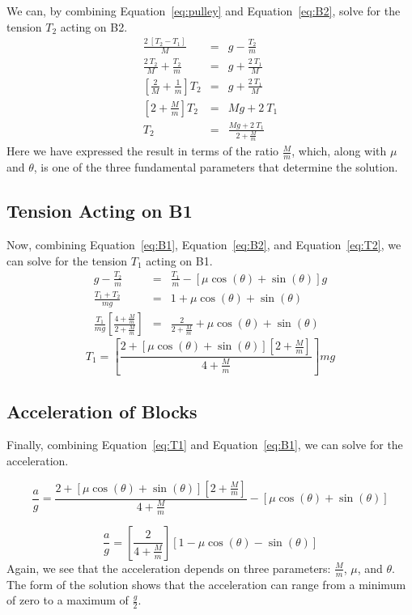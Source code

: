 \documentclass[twocolumn]{article}
\begin{document}
We can, by combining Equation~\ref{eq:pulley} and Equation~\ref{eq:B2}, solve
for the tension $T_2$ acting on B2.
\begin{eqnarray}
   \nonumber
   \frac{2 \: [T_2 - T_1]}{M} &=& g - \frac{T_2}{m}\\
   \nonumber
   \frac{2 \: T_2}{M} + \frac{T_2}{m} &=& g + \frac{2 \: T_1}{M}\\
   \nonumber
   \left[ \frac{2}{M} + \frac{1}{m} \right] T_2 &=& g + \frac{2 \: T_1}{M}\\
   \nonumber
   \left[ 2 + \frac{M}{m} \right] T_2 &=& M g + 2 \: T_1\\
   T_2 &=& \frac{M g + 2 \: T_1}{2 + \tfrac{M}{m}}
   \label{eq:T2}
\end{eqnarray}
Here we have expressed the result in terms of the ratio $\tfrac{M}{m}$, which,
along with $\mu$ and $\theta$, is one of the three fundamental parameters that
determine the solution.

\subsection{Tension Acting on B1}

Now, combining Equation~\ref{eq:B1}, Equation~\ref{eq:B2}, and
Equation~\ref{eq:T2}, we can solve for the tension $T_1$ acting on B1.
\begin{eqnarray}
   \nonumber
   g - \frac{T_2}{m} &=& \frac{T_1}{m} - [\mu \cos(\theta) + \sin(\theta)] g\\
   \nonumber
   \frac{T_1 + T_2}{mg} &=& 1 + \mu \cos(\theta) + \sin(\theta)\\
   \nonumber
   \frac{T_1}{mg} \left[ \frac{4 + \tfrac{M}{m}}{2 + \tfrac{M}{m}} \right] &=&
   \frac{2}{2 + \tfrac{M}{m}} + \mu \cos(\theta) + \sin(\theta)
\end{eqnarray}
\begin{equation}
   T_1 = \left[ \frac{2 + [\mu \cos(\theta) + \sin(\theta)][2 +
   \tfrac{M}{m}]}{4 + \tfrac{M}{m}} \right] mg
   \label{eq:T1}
\end{equation}

\subsection{Acceleration of Blocks}

Finally, combining Equation~\ref{eq:T1} and Equation~\ref{eq:B1}, we can solve
for the acceleration.
\begin{small}
\begin{equation*}
   \frac{a}{g} = \frac{2 + [\mu \cos(\theta) + \sin(\theta)][2 +
   \tfrac{M}{m}]}{4 + \tfrac{M}{m}} - [\mu \cos(\theta) + \sin(\theta)]
\end{equation*}
\end{small}
\begin{equation}
   \frac{a}{g} = \left[ \frac{2}{4 + \tfrac{M}{m}} \right] [1 - \mu
   \cos(\theta) - \sin(\theta)]
\end{equation}
Again, we see that the acceleration depends on three parameters:
$\tfrac{M}{m}$, $\mu$, and $\theta$. The form of the solution shows that the
acceleration can range from a minimum of zero to a maximum of $\tfrac{g}{2}$.
\end{document}
